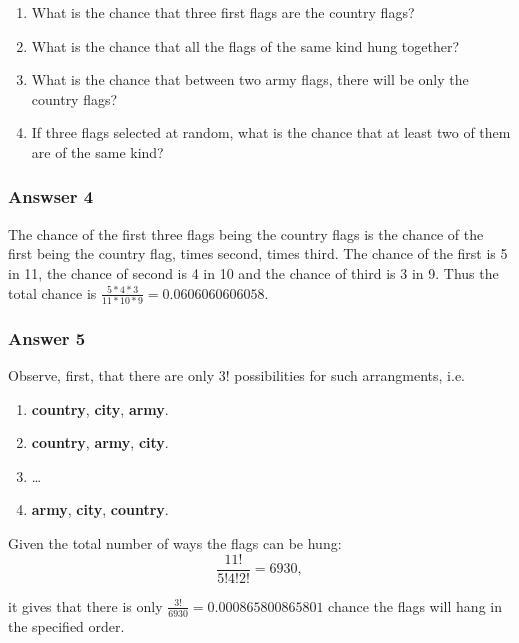 \documentclass[11pt]{article}
\begin{document}
\begin{enumerate}
\item What is the chance that three first flags are the country flags?
\item What is the chance that all the flags of the same kind hung together?
\item What is the chance that between two army flags, there will be only
the country flags?
\item If three flags selected at random, what is the chance that at least
two of them are of the same kind?
\end{enumerate}

\subsubsection{Answser 4}
\label{sec-1-2-1}
The chance of the first three flags being the country flags is the chance
of the first being the country flag, times second, times third.
The chance of the first is 5 in 11, the chance of second is 4 in 10 and
the chance of third is 3 in 9.  Thus the total chance is
$\frac{5 * 4 * 3}{11 * 10 * 9} = \num{0.0606060606058}$.
\subsubsection{Answer 5}
\label{sec-1-2-2}
Observe, first, that there are only 3! possibilities for such arrangments,
i.e.
\begin{enumerate}
\item \textbf{country}, \textbf{city}, \textbf{army}.
\item \textbf{country}, \textbf{army}, \textbf{city}.
\item \ldots{}
\item \textbf{army}, \textbf{city}, \textbf{country}.
\end{enumerate}

Given the total number of ways the flags can be hung:
\begin{equation*}
  \frac{11!}{5!4!2!} = 6930,
\end{equation*}

it gives that there is only $\frac{3!}{6930} = \num{0.000865800865801}$
chance the flags will hang in the specified order.
\end{document}
